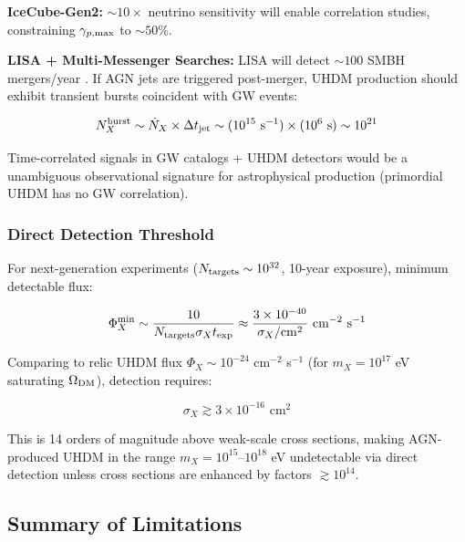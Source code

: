 \documentclass[twocolumn,superscriptaddress,prd,nofootinbib]{revtex4-2}
\begin{document}
\textbf{IceCube-Gen2:} $\sim 10\times$ neutrino sensitivity will enable correlation studies, constraining $\gamma_{p,\rm max}$ to $\sim 50\%$.

\textbf{LISA + Multi-Messenger Searches:} LISA will detect $\sim 100$ SMBH mergers/year \citep{AmaroSeoane2017}. If AGN jets are triggered post-merger, UHDM production should exhibit transient bursts coincident with GW events:

\begin{equation}
N_X^{\rm burst} \sim \dot{N}_X \times \Delta t_{\rm jet} \sim (10^{15} \text{ s}^{-1}) \times (10^6 \text{ s}) \sim 10^{21}
\label{eq:N_burst}
\end{equation}

Time-correlated signals in GW catalogs + UHDM detectors would be a unambiguous observational signature for astrophysical production (primordial UHDM has no GW correlation).

\subsubsection{Direct Detection Threshold}

For next-generation experiments ($N_{\rm targets} \sim 10^{32}$, 10-year exposure), minimum detectable flux:

\begin{equation}
\Phi_X^{\rm min} \sim \frac{10}{N_{\rm targets} \sigma_X t_{\rm exp}} \approx \frac{3 \times 10^{-40}}{\sigma_X/{\rm cm}^2} \text{ cm}^{-2} \text{ s}^{-1}
\label{eq:flux_threshold}
\end{equation}

Comparing to relic UHDM flux $\Phi_X \sim 10^{-24}$ cm$^{-2}$ s$^{-1}$ (for $m_X = 10^{17}$ eV saturating $\Omega_{\rm DM}$), detection requires:

\begin{equation}
\sigma_X \gtrsim 3 \times 10^{-16} \text{ cm}^2
\label{eq:sigma_threshold}
\end{equation}

This is 14 orders of magnitude above weak-scale cross sections, making AGN-produced UHDM in the range $m_X = 10^{15}$--$10^{18}$ eV undetectable via direct detection unless cross sections are enhanced by factors $\gtrsim 10^{14}$.

\subsection{Summary of Limitations}
\end{document}
